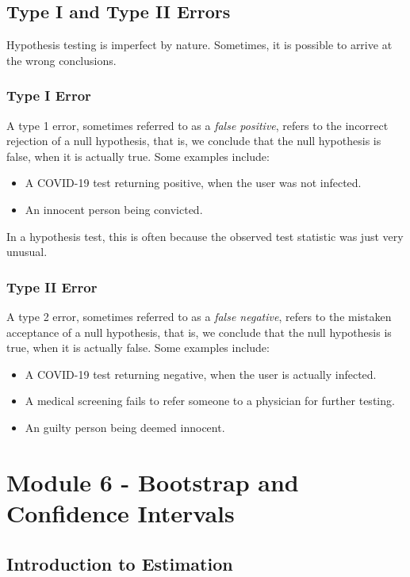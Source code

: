 \documentclass[10pt]{article}
\begin{document}
\subsection{Type I and Type II Errors}
Hypothesis testing is imperfect by nature. Sometimes, it is possible to arrive at the wrong conclusions.
\subsubsection{Type I Error}
A type 1 error, sometimes referred to as a \textit{false positive}, refers to the incorrect rejection of a null hypothesis, that is, we conclude that the null hypothesis is false, when it is actually true. Some examples include:
\begin{itemize}
    \item A COVID-19 test returning positive, when the user was not infected.
    \item An innocent person being convicted.
\end{itemize}
In a hypothesis test, this is often because the observed test statistic was just very unusual.
\subsubsection{Type II Error}
A type 2 error, sometimes referred to as a \textit{false negative}, refers to the mistaken acceptance of a null hypothesis, that is, we conclude that the null hypothesis is true, when it is actually false. Some examples include:
\begin{itemize}
    \item A COVID-19 test returning negative, when the user is actually infected.
    \item A medical screening fails to refer someone to a physician for further testing.
    \item An guilty person being deemed innocent.
\end{itemize}
\section{Module 6 - Bootstrap and Confidence Intervals}
\subsection{Introduction to Estimation}
\end{document}
